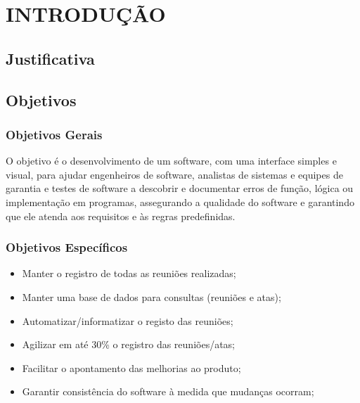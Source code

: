 %
%

\chapter{INTRODUÇÃO}\label{chap:introducao}



\section{Justificativa}

\section{Objetivos}

\subsection{Objetivos Gerais}

O objetivo é o desenvolvimento de um software, com uma interface simples e visual, para ajudar engenheiros de software, analistas de sistemas e equipes de garantia e testes de software a descobrir e documentar erros de função, lógica ou implementação em programas, assegurando a qualidade do software e garantindo que ele atenda aos requisitos e às regras predefinidas.

\subsection{Objetivos Específicos}

\begin{itemize}
    \item Manter o registro de todas as reuniões realizadas;
    \item Manter uma base de dados para consultas (reuniões e atas);
    \item Automatizar/informatizar o registo das reuniões;
    \item Agilizar em até 30\% o registro das reuniões/atas;
    \item Facilitar o apontamento das melhorias ao produto;
    \item Garantir consistência do software à medida que mudanças ocorram;
\end{itemize}
